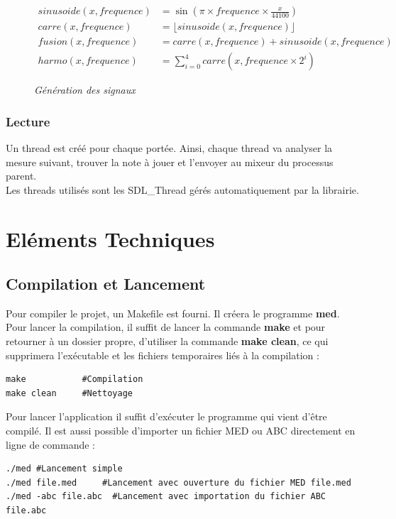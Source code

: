 \documentclass[12pt]{report}
\begin{document}
\begin{figure}[H]
\centering
\[
\begin{aligned}
sinusoide(x, frequence) &  =  \sin(\pi\times \mathit{frequence}\times \frac{x}{44100}) \\
carre(x, frequence)  & =   \lfloor sinusoide(x, \mathit{frequence}) \rfloor   \\
fusion(x, frequence) & =  \mathit{carre}(x, \mathit{frequence}) + \mathit{sinusoide}(x, \mathit{frequence})  \\
harmo(x, frequence) & =  \sum_{i=0}^{4} \mathit{carre}(x, \mathit{frequence}\times 2^i)
\end{aligned}
 \]
\caption{\textit{Génération des signaux}}
\end{figure}



\subsection{Lecture}
Un thread est créé pour chaque portée. Ainsi, chaque thread va analyser la mesure suivant, trouver la note à jouer et l'envoyer au mixeur du processus parent.\\
Les threads utilisés sont les SDL\_Thread gérés automatiquement par la librairie.\\


\newpage
\chapter{Eléments Techniques}
\section{Compilation et Lancement}
Pour compiler le projet, un Makefile est fourni. Il créera le programme \textbf{med}. Pour lancer la compilation, 
il suffit de lancer la commande \textbf{make} et pour retourner à un dossier propre, d'utiliser la commande \textbf{make clean},
ce qui supprimera l'exécutable et les fichiers temporaires liés à la compilation :\\
\lstset{style=Bash}
\begin{lstlisting}
make 		   #Compilation
make clean 	   #Nettoyage
\end{lstlisting}
\vskip 0.1in
Pour lancer l'application il suffit d'exécuter le programme qui vient d'être compilé. Il est aussi possible d'importer un fichier MED ou ABC directement en ligne de commande :\\
\begin{lstlisting}
./med #Lancement simple
./med file.med     #Lancement avec ouverture du fichier MED file.med
./med -abc file.abc  #Lancement avec importation du fichier ABC file.abc
\end{lstlisting}
\end{document}
